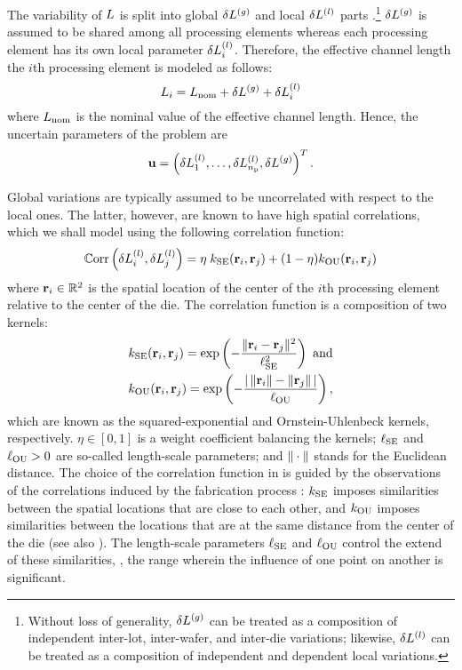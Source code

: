
The variability of $L$ is split into global ${\delta L^{(g)}}$ and local $\delta L^{(l)}$ parts \cite{chandra2010, shen2009}.\footnote{Without loss of generality, ${\delta L^{(g)}}$ can be treated as a composition of independent inter-lot, inter-wafer, and inter-die variations; likewise, $\delta L^{(l)}$ can be treated as a composition of independent and dependent local variations.}
${\delta L^{(g)}}$ is assumed to be shared among all processing elements whereas each processing element has its own local parameter $\delta L^{(l)}_i$.
Therefore, the effective channel length the $i$th processing element is modeled as follows:
\begin{equation} \elabel{leakage-partition}
  \Leff_i = \nLeff + \gLeff + \lLeff_i
\end{equation}
where $L_\text{nom}$ is the nominal value of the effective channel length.
Hence, the uncertain parameters of the problem are
\begin{equation} \elabel{uncertain-parameters}
  \vU = \vec{\lLeff_1, \dotsc, \lLeff_\nprocs, \gLeff}.
\end{equation}

Global variations are typically assumed to be uncorrelated with respect to the local ones.
The latter, however, are known to have high spatial correlations, which we shall model using the following correlation function:
\begin{equation} \elabel{correlation-function}
  \oCorr{\lLeff_i, \lLeff_j} = \eta \; \fCorr_\SE(\vR_i, \vR_j) + (1 - \eta) \fCorr_\OU(\vR_i, \vR_j)
\end{equation}
where $\mathbf{r}_i \in \mathbb{R}^2$ is the spatial location of the center of the $i$th processing element relative to the center of the die. The correlation function is a composition of two kernels:
\begin{align*}
  & \fCorr_\SE(\vR_i, \vR_j) = \exp\left(-\frac{\norm{\vR_i - \vR_j}^2}{\ell_\SE^2}\right) \text{ and} \\
  & \fCorr_\OU(\vR_i, \vR_j) = \exp\left(- \frac{\abs{\,\norm{\vR_i} - \norm{\vR_j}\,}}{\ell_\OU} \right),
\end{align*}
which are known as the squared-exponential and Ornstein-Uhlenbeck kernels, respectively.
$\eta \in [0, 1]$ is a weight coefficient balancing the kernels; $\ell_{\text{SE}}$ and $\ell_{\text{OU}} > 0$ are so-called length-scale parameters; and $\| \cdot \|$ stands for the Euclidean distance.
The choice of the correlation function in  is guided by the observations of the correlations induced by the fabrication process \cite{chandrakasan2001, friedberg2005, cheng2011}: $\fCorr_\SE$ imposes similarities between the spatial locations that are close to each other, and $\fCorr_\OU$ imposes similarities between the locations that are at the same distance from the center of the die (see also \cite{huang2009, ghanem1991, lee2013, bhardwaj2008, ghanta2006}).
The length-scale parameters $\ell_{\text{SE}}$ and $\ell_{\text{OU}}$ control the extend of these similarities, \ie, the range wherein the influence of one point on another is significant.

